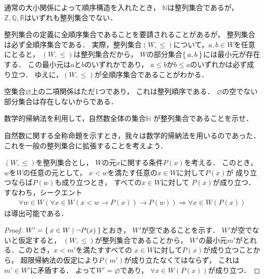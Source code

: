    \begin{ex} \label{ex:wellorderedset}
     通常の大小関係によって順序構造を入れたとき，
     $\mathbb{N}$は整列集合であるが，
     $\mathbb{Z},\mathbb{Q},\mathbb{R}$はいずれも整列集合でない．
   \end{ex}

   整列集合の定義に全順序集合であることを要請されることがあるが，
   整列集合は必ず全順序集合である．
   実際，整列集合$(W, {\leq})$について，$a,b \in W$を任意にとると，
   $(W, {\leq})$は整列集合だから，
   $W$の部分集合$\Set{a,b}$には最小元が存在する．
   この最小元は$a$と$b$のいずれかであり，
   $a \leq b$か$b \leq a$のいずれかは必ず成り立つ．
   ゆえに，$(W, {\leq})$が全順序集合であることがわかる．

   空集合$\varnothing$上の二項関係はただ1つであり，
   これは整列順序である．
   $\varnothing$の空でない部分集合は存在しないからである．



   \begin{que} \label{que:Nseiretu}
     数学的帰納法を利用して，自然数全体の集合$\mathbb{N}$
     が整列集合であることを示せ．
   \end{que}

   自然数に関する全称命題を示すとき，我々は数学的帰納法を用いるのであった．
   これを一般の整列集合に拡張することを考えよう．

   \begin{thm}[超限帰納法] \label{thm:traind}
     $(W, {\leq})$を整列集合とし，
     $W$の元$x$に関する条件$P(x)$を考える．
     このとき，$w$を$W$の任意の元として，
     $x<w$を満たす任意の$x \in W$に対して$P(x)$が
     成り立つならば$P(w)$も成り立つとき，
     すべての$x \in W$に対して
     $P(x)$が成り立つ．
     すなわち，シークエント
     \begin{align}
       \forall w \in W ( \forall x \in W (x<w \to P(x) ) \to P(w) ) 
       \Longrightarrow \forall x \in W ( P(x) )
       \label{eq:traind}
     \end{align}
     は導出可能である．
   \end{thm}

   \begin{proof}
     $W' = \Set{ x \in W \mid \lnot P(x) }$とおき，
     $W'$が空であることを示す．
     $W'$が空でないと仮定すると，
     $( W , {\leq})$が整列集合であることから，
     $W'$の最小元$m'$がとれる．このとき，$x<m'$を満たすすべての
     $x \in W$に対して$P(x)$が成り立つことから，
     超限帰納法の仮定により$P(m')$が成り立たなくてはならず，
     これは$m' \in W'$に矛盾する．
     よって$W'= \varnothing$であり，
     $\forall x \in W (P(x))$が成り立つ．
   \end{proof}


